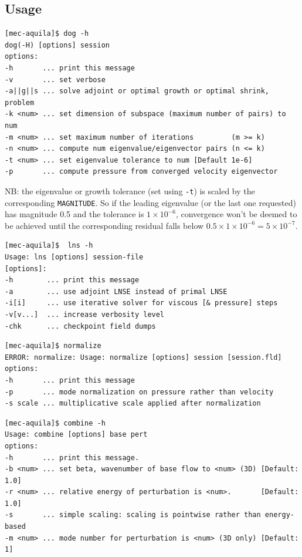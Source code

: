 \documentclass[11pt,a4paper]{report}
\begin{document}
\subsection{Usage}

{\small
\begin{verbatim}
[mec-aquila]$ dog -h
dog(-H) [options] session
options:
-h       ... print this message
-v       ... set verbose
-a||g||s ... solve adjoint or optimal growth or optimal shrink, problem
-k <num> ... set dimension of subspace (maximum number of pairs) to num
-m <num> ... set maximum number of iterations         (m >= k)
-n <num> ... compute num eigenvalue/eigenvector pairs (n <= k)
-t <num> ... set eigenvalue tolerance to num [Default 1e-6]
-p       ... compute pressure from converged velocity eigenvector
\end{verbatim}
}
NB: the eigenvalue or growth tolerance (set using \verb+-t+) is
scaled by the corresponding \verb+MAGNITUDE+.  So if the leading
eigenvalue (or the last one requested) has magnitude 0.5 and the
tolerance is $1\times10^{-6}$, convergence won't be deemed to be
achieved until the corresponding residual falls below
$0.5\times1\times10^{-6}=5\times10^{-7}$.

{\small
\begin{verbatim}
[mec-aquila]$  lns -h
Usage: lns [options] session-file
[options]:
-h        ... print this message
-a        ... use adjoint LNSE instead of primal LNSE
-i[i]     ... use iterative solver for viscous [& pressure] steps
-v[v...]  ... increase verbosity level
-chk      ... checkpoint field dumps
\end{verbatim}
}

{\small
\begin{verbatim}
[mec-aquila]$ normalize
ERROR: normalize: Usage: normalize [options] session [session.fld]
options:
-h       ... print this message
-p       ... mode normalization on pressure rather than velocity
-s scale ... multiplicative scale applied after normalization
\end{verbatim}
}

{\small
\begin{verbatim}
[mec-aquila]$ combine -h
Usage: combine [options] base pert
options:
-h       ... print this message.
-b <num> ... set beta, wavenumber of base flow to <num> (3D) [Default: 1.0]
-r <num> ... relative energy of perturbation is <num>.       [Default: 1.0]
-s       ... simple scaling: scaling is pointwise rather than energy-based
-m <num> ... mode number for perturbation is <num> (3D only) [Default: 1]
\end{verbatim}
}
\end{document}
